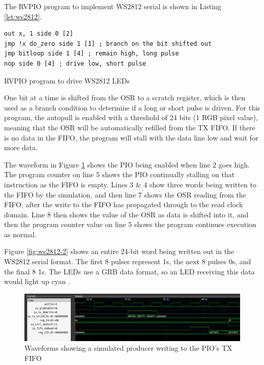 The RVPIO program to implement WS2812 serial is shown in Listing \ref{lst:ws2812}.

\begin{listing}[h!]
    \begin{verbatim}
out x, 1 side 0 [2] 
jmp !x do_zero side 1 [1] ; branch on the bit shifted out
jmp bitloop side 1 [4] ; remain high, long pulse
nop side 0 [4] ; drive low, short pulse
    \end{verbatim}
    \caption{RVPIO program to drive WS2812 LEDs}
    \label{lst:ws2812}
\end{listing}

One bit at a time is shifted from the OSR to a scratch register, which is then used as a branch condition to determine if a long or short pulse is driven. For this program, the autopull is enabled with a threshold of 24 bits (1 RGB pixel value), meaning that the OSR will be automatically refilled from the TX FIFO. If there is no data in the FIFO, the program will stall with the data line low and wait for more data.

The waveform in Figure \ref{fig:ws2812-1} shows the PIO being enabled when line 2 goes high. The program counter on line 5 shows the PIO continually stalling on that instruction as the FIFO is empty. Lines 3 \& 4 show three words being written to the FIFO by the simulation, and then line 7 shows the OSR reading from the FIFO, after the write to the FIFO has propagated through to the read clock domain. Line 8 then shows the value of the OSR as data is shifted into it, and then the program counter value on line 5 shows the program continues execution as normal.

Figure \ref{fig:ws2812-2} shows an entire 24-bit word being written out in the WS2812 serial format. The first 8 pulses represent 1s, the next 8 pulses 0s, and the final 8 1s. The LEDs use a GRB data format, so an LED receiving this data would light up cyan \cite{ws2812}.

\begin{figure}[H]
    \centering
    \includegraphics[width=\textwidth]{../img/ws2812-1.png}
    \caption{Waveforms showing a simulated producer writing to the PIO's TX FIFO}
    \label{fig:ws2812-1}
\end{figure}

